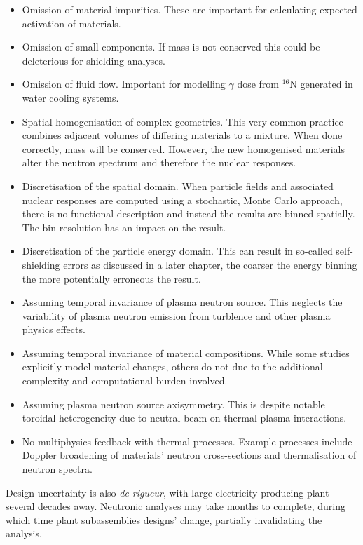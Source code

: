 \begin{itemize}
\item Omission of material impurities. These are important for calculating expected activation of materials.
\item Omission of small components. If mass is not conserved this could be deleterious for shielding analyses.
\item Omission of fluid flow. Important for modelling $\gamma$ dose from $^{16}$N generated in water cooling systems.
\item Spatial homogenisation of complex geometries. This very common practice combines adjacent volumes of differing materials to a mixture. When done correctly, mass will be conserved. However, the new homogenised materials alter the neutron spectrum and therefore the nuclear responses.
\item Discretisation of the spatial domain. When particle fields and associated nuclear responses are computed using a stochastic, Monte Carlo approach, there is no functional description and instead the results are binned spatially. The bin resolution has an impact on the result. 
\item Discretisation of the particle energy domain. This can result in so-called self-shielding errors as discussed in a later chapter, the coarser the energy binning the more potentially erroneous the result.
\item Assuming temporal invariance of plasma neutron source. This neglects the variability of plasma neutron emission from turblence and other plasma physics effects.
\item Assuming temporal invariance of material compositions. While some studies explicitly model material changes, others do not due to the additional complexity and computational burden involved.
\item Assuming plasma neutron source axisymmetry. This is despite notable toroidal heterogeneity due to neutral beam on thermal plasma interactions.
\item No multiphysics feedback with thermal processes. Example processes include Doppler broadening of materials' neutron cross-sections and thermalisation of neutron spectra.
\end{itemize}

Design uncertainty is also \textit{de rigueur}, with large electricity producing plant several decades away. Neutronic analyses may take months to complete, during which time plant subassemblies designs' change, partially invalidating the analysis. 

